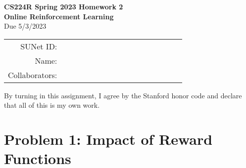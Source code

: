 \documentclass[12pt]{article}
\begin{document}
\begin{center}
{\Large \textbf{CS224R Spring 2023 Homework 2 \\ Online Reinforcement Learning}}
\\ {\large Due 5/3/2023}

\begin{tabular}{rl}
SUNet ID: & $\hspace{6cm}$\\
Name: & \\
Collaborators: & 
\end{tabular}
\end{center}

\noindent By turning in this assignment, I agree by the Stanford honor code and declare
that all of this is my own work.


\newpage
\section*{Problem 1: Impact of Reward Functions}
\end{document}
